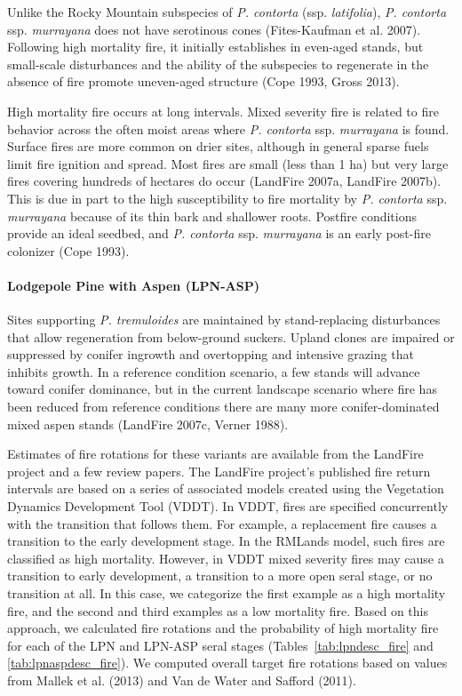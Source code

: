 Unlike the Rocky Mountain subspecies of \emph{P. contorta} (ssp. \emph{latifolia}), \emph{P. contorta} ssp. \emph{murrayana} does not have serotinous cones (Fites-Kaufman et al. 2007). Following high mortality fire, it initially establishes in even-aged stands, but small-scale disturbances and the ability of the subspecies to regenerate in the absence of fire promote uneven-aged structure (Cope 1993, Gross 2013).

High mortality fire occurs at long intervals. Mixed severity fire is related to fire behavior across the often moist areas where \emph{P. contorta} ssp. \emph{murrayana} is found. Surface fires are more common on drier sites, although in general sparse fuels limit fire ignition and spread. Most fires are small (less than 1 ha) but very large fires covering hundreds of hectares do occur (LandFire 2007a, LandFire 2007b). This is due in part to the high susceptibility to fire mortality by \emph{P. contorta} ssp. \emph{murrayana} because of its thin bark and shallower roots. Postfire conditions provide an ideal seedbed, and \emph{P. contorta} ssp. \emph{murrayana} is an early post-fire colonizer (Cope 1993).

\paragraph{Lodgepole Pine with Aspen (LPN-ASP)}	Sites supporting \emph{P. tremuloides} are maintained by stand-replacing disturbances that allow regeneration from below-ground suckers. Upland clones are impaired or suppressed by conifer ingrowth and overtopping and intensive grazing that inhibits growth. In a reference condition scenario, a few stands will advance toward conifer dominance, but in the current landscape scenario where fire has been reduced from reference conditions there are many more conifer-dominated mixed aspen stands (LandFire 2007c, Verner 1988). 

Estimates of fire rotations for these variants are available from the LandFire project and a few review papers. The LandFire project’s published fire return intervals are based on a series of associated models created using the Vegetation Dynamics Development Tool (VDDT). In VDDT, fires are specified concurrently with the transition that follows them. For example, a replacement fire causes a transition to the early development stage. In the RMLands model, such fires are classified as high mortality. However, in VDDT mixed severity fires may cause a transition to early development, a transition to a more open seral stage, or no transition at all. In this case, we categorize the first example as a high mortality fire, and the second and third examples as a low mortality fire. Based on this approach, we calculated fire rotations and the probability of high mortality fire for each of the LPN and LPN-ASP seral stages (Tables~\ref{tab:lpndesc_fire} and \ref{tab:lpnaspdesc_fire}). We computed overall target fire rotations based on values from Mallek et al. (2013) and Van de Water and Safford (2011). 




